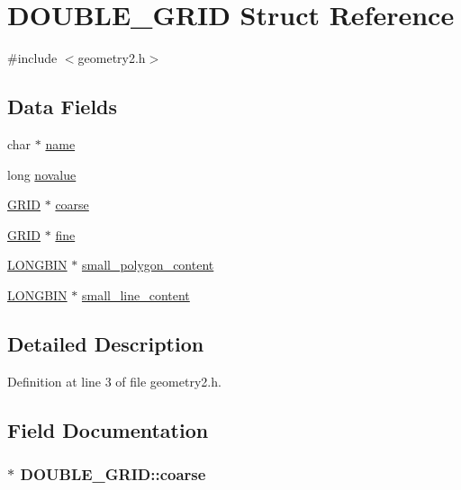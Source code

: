 \hypertarget{struct_d_o_u_b_l_e___g_r_i_d}{\section{D\-O\-U\-B\-L\-E\-\_\-\-G\-R\-I\-D Struct Reference}
\label{struct_d_o_u_b_l_e___g_r_i_d}
}


{\ttfamily \#include $<$geometry2.\-h$>$}

\subsection*{Data Fields}
\begin{DoxyCompactItemize}
\item 
char $\ast$ \hyperlink{struct_d_o_u_b_l_e___g_r_i_d_a0339d26509edeee1d0f65e27ddbdbdc2}{name}
\item 
long \hyperlink{struct_d_o_u_b_l_e___g_r_i_d_acb602224bc4b7fe8ba49abeae8704387}{novalue}
\item 
\hyperlink{struct_g_r_i_d}{G\-R\-I\-D} $\ast$ \hyperlink{struct_d_o_u_b_l_e___g_r_i_d_a2fbdd085df9423c7b25891ea47a44333}{coarse}
\item 
\hyperlink{struct_g_r_i_d}{G\-R\-I\-D} $\ast$ \hyperlink{struct_d_o_u_b_l_e___g_r_i_d_a8690f5b1ae56932e6db1ad50c318d050}{fine}
\item 
\hyperlink{struct_l_o_n_g_b_i_n}{L\-O\-N\-G\-B\-I\-N} $\ast$ \hyperlink{struct_d_o_u_b_l_e___g_r_i_d_abd184e763abf235679ab867b1d370249}{small\-\_\-polygon\-\_\-content}
\item 
\hyperlink{struct_l_o_n_g_b_i_n}{L\-O\-N\-G\-B\-I\-N} $\ast$ \hyperlink{struct_d_o_u_b_l_e___g_r_i_d_a5144f0a2fa85740ff967b4d6cc5080a2}{small\-\_\-line\-\_\-content}
\end{DoxyCompactItemize}


\subsection{Detailed Description}


Definition at line 3 of file geometry2.\-h.



\subsection{Field Documentation}
\hypertarget{struct_d_o_u_b_l_e___g_r_i_d_a2fbdd085df9423c7b25891ea47a44333}{
\subsubsection[{coarse}]{$\ast$ D\-O\-U\-B\-L\-E\-\_\-\-G\-R\-I\-D\-::coarse}}\label{struct_d_o_u_b_l_e___g_r_i_d_a2fbdd085df9423c7b25891ea47a44333}


